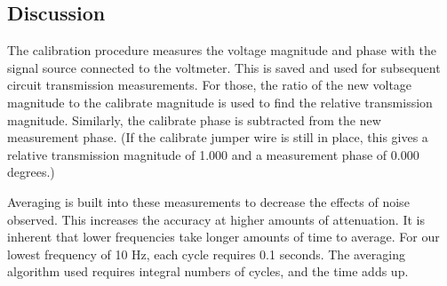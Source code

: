 %
\subsection{Discussion}
\label{subsect:TDiscus}
The calibration procedure measures the voltage magnitude and phase with the signal source connected to the voltmeter.  This is saved and used for subsequent  circuit transmission measurements.  For those, the ratio of the new voltage magnitude to the calibrate magnitude is used to find the relative transmission magnitude.  Similarly, the calibrate phase is subtracted from the new measurement phase.  (If the calibrate jumper wire is still in place, this gives a relative transmission magnitude of 1.000 and a measurement phase of 0.000 degrees.)

Averaging is built into these measurements to decrease the effects of noise observed.  This increases the accuracy at higher amounts of attenuation.  It is inherent that lower frequencies take longer amounts of time to average.  For our lowest frequency of 10 Hz, each cycle requires 0.1 seconds.  The averaging algorithm used requires integral numbers of cycles, and the time adds up.
